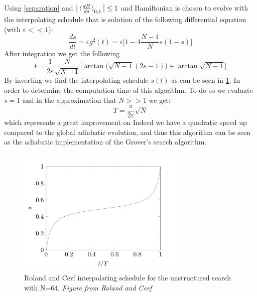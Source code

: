     Using \cref{separation} and $\big|\braket{\frac{dH}{ds}}_{0,1}\big| \leq 1$ and Hamiltonian is chosen to evolve with the interpolating schedule that is solution of the following differential equation (with $\varepsilon<<1$):
    \begin{equation}
      \frac{ds}{dt} = \varepsilon g^2(t) = \varepsilon\Big[1-4\frac{N-1}{N}s(1-s)\Big]
    \end{equation}
    After integration we get the following
    \begin{equation}
      t =\frac{1}{2\varepsilon}\frac{N}{\sqrt{N-1}}\Big[\arctan\big(\sqrt{N-1}(2s-1)\big) + \arctan{\sqrt{N-1}}\Big]
    \end{equation}
    By inverting we find the interpolating schedule $s(t)$ as can be seen in \cref{interpolating_schedule}. In order to determine the computation time of this algorithm. To do so we evaluate $s=1$ and in the approximation that $N>>1$ we get:
    \begin{equation}
      T = \frac{\pi}{2\varepsilon}\sqrt{N}
    \end{equation}
    which represents a great improvement on  Indeed we have a quadratic speed up compared to the global adiabatic evolution, and thus this algorithm can be seen as the adiabatic implementation of the Grover's search algorithm.
    \begin{figure}[h]
      \centering
      \includegraphics[width=80mm]{figures/chapter1/interpolating_schedule}
      \caption[Roland and Cerf interpolating schedule for the unstructured search with N=64]{Roland and Cerf interpolating schedule for the unstructured search with N=64. \textit{Figure from Roland and Cerf} \cite{Roland2002}}
      \label{interpolating_schedule}
    \end{figure}



